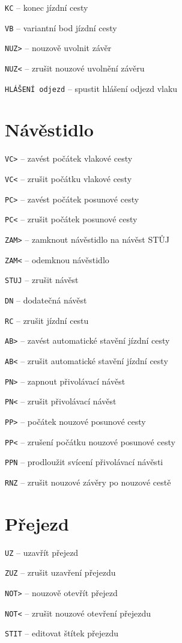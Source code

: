 \documentclass[12pt,a4paper,landscape]{article}
\begin{document}
\begin{multicols}{3}
\begin{compactitem}
	\item \texttt{KC} -- konec jízdní cesty
	\item \texttt{VB} -- variantní bod jízdní cesty
	
	\item \texttt{NUZ>} -- nouzově uvolnit závěr
	\item \texttt{NUZ<} -- zrušit nouzové uvolnění závěru
	
	\item \texttt{HLÁŠENÍ odjezd} -- spustit hlášení odjezd vlaku
\end{compactitem}	

\section{Návěstidlo}
\begin{compactitem}
	\item \texttt{VC>} -- zavést počátek vlakové cesty
	\item \texttt{VC<} -- zrušit počátku vlakové cesty
	\item \texttt{PC>} -- zavést počátek posunové cesty
	\item \texttt{PC<} -- zrušit počátek posunové cesty
	\item \texttt{ZAM>} -- zamknout návěstidlo na návěst STŮJ
	\item \texttt{ZAM<} -- odemknou návěstidlo
	\item \texttt{STUJ} -- zrušit návěst
	\item \texttt{DN} -- dodatečná návěst
	\item \texttt{RC} -- zrušit jízdní cestu
	\item \texttt{AB>} -- zavést automatické stavění jízdní cesty
	\item \texttt{AB<} -- zrušit automatické stavění jízdní cesty
	\item \texttt{PN>} -- zapnout přivolávací návěst
	\item \texttt{PN<} -- zrušit přivolávací návěst
	\item \texttt{PP>} -- počátek nouzové posunové cesty
	\item \texttt{PP<} -- zrušení počátku nouzové posunové cesty
	\item \texttt{PPN} -- prodloužit svícení přivolávací návěsti
	\item \texttt{RNZ} -- zrušit nouzové závěry po nouzové cestě
\end{compactitem}	

\section{Přejezd}
\begin{compactitem}
	\item \texttt{UZ} -- uzavřít přejezd
	\item \texttt{ZUZ} -- zrušit uzavření přejezdu
	\item \texttt{NOT>} -- nouzově otevřít přejezd
	\item \texttt{NOT<} -- zrušit nouzové otevření přejezdu
	\item \texttt{STIT} -- editovat štítek přejezdu	
\end{compactitem}


\end{multicols}
\end{document}
